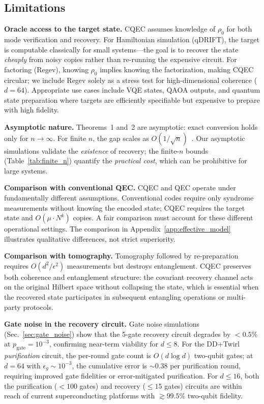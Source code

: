 \documentclass[pra,twocolumn,superscriptaddress,longbibliography,floatfix]{revtex4-2}
\begin{document}
\subsection{Limitations}
\label{sec:limitations}

\textbf{Oracle access to the target state.}
CQEC assumes knowledge of $\rho_0$ for both mode verification and recovery.
For Hamiltonian simulation (qDRIFT), the target is computable classically for small systems---the goal is to recover the state \emph{cheaply} from noisy copies rather than re-running the expensive circuit.
For factoring (Regev), knowing $\rho_0$ implies knowing the factorization, making CQEC circular; we include Regev solely as a stress test for high-dimensional coherence ($d = 64$).
Appropriate use cases include VQE states, QAOA outputs, and quantum state preparation where targets are efficiently specifiable but expensive to prepare with high fidelity.

\textbf{Asymptotic nature.}
Theorems~1 and~2 are asymptotic: exact conversion holds only for $n \to \infty$.
For finite $n$, the gap scales as $O(1/\sqrt{n})$~\cite{Shiraishi2024}.
Our asymptotic simulations validate the \emph{existence} of recovery; the finite-$n$ bounds (Table~\ref{tab:finite_n}) quantify the \emph{practical cost}, which can be prohibitive for large systems.

\textbf{Comparison with conventional QEC.}
CQEC and QEC operate under fundamentally different assumptions.
Conventional codes require only syndrome measurements without knowing the encoded state; CQEC requires the target state and $O(\mu \cdot N^k)$ copies.
A fair comparison must account for these different operational settings.
The comparison in Appendix~\ref{app:effective_model} illustrates qualitative differences, not strict superiority.

\textbf{Comparison with tomography.}
Tomography followed by re-preparation requires $O(d^2/\epsilon^2)$ measurements but destroys entanglement.
CQEC preserves both coherence and entanglement structure: the covariant recovery channel acts on the original Hilbert space without collapsing the state, which is essential when the recovered state participates in subsequent entangling operations or multi-party protocols.

\textbf{Gate noise in the recovery circuit.}
Gate noise simulations (Sec.~\ref{sec:gate_noise}) show that the 5-gate recovery circuit degrades by $< 0.5\%$ at $p_\mathrm{gate} = 10^{-3}$, confirming near-term viability for $d \leq 8$.
For the DD+Twirl \emph{purification} circuit, the per-round gate count is $O(d \log d)$ two-qubit gates; at $d = 64$ with $\epsilon_g \sim 10^{-3}$, the cumulative error is $\sim\!0.38$ per purification round, requiring improved gate fidelities or error-mitigated purification.
For $d \leq 16$, both the purification ($<\!100$ gates) and recovery ($\leq 15$ gates) circuits are within reach of current superconducting platforms with $\gtrsim\!99.5\%$ two-qubit fidelity.
\end{document}
